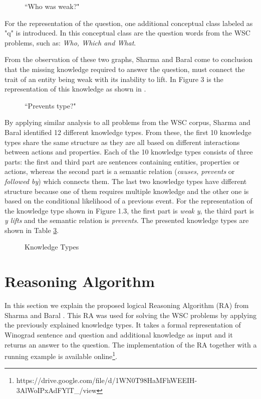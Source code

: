 \begin{figure}
	\centering
	
	\caption{\label{Graph12}``Who was weak?"}
\end{figure}

For the representation of the question, one additional conceptual class labeled as "q" is introduced. In this conceptual class are the question words from the WSC problems, such as: \textit{Who, Which and What}.

From the observation of these two graphs, Sharma and Baral \cite{2018CommonsenseKT} come to conclusion that the missing knowledge required to answer the question, must connect the trait of an entity being weak with its inability to lift. In Figure 3 is the representation of this knowledge as shown in \cite{2018CommonsenseKT}. 


\begin{figure}
	\centering
	
	\caption{\label{Graph13}``Prevents type?"}
\end{figure}


By applying similar analysis to all problems from the WSC corpus, Sharma and Baral \cite{2018CommonsenseKT} identified 12 different knowledge types. From these, the first 10 knowledge types share the same structure as they are all based on different interactions between actions and properties. Each of the 10 knowledge types consists of three parts: the first and third part are sentences containing entities, properties or actions, whereas the second part is a semantic relation (\textit{causes, prevents} or \textit{followed by}) which connects them. The last two knowledge types have different structure because one of them requires multiple knowledge and the other one is based on the conditional likelihood of a previous event. 
For the representation of the knowledge type shown in Figure 1.3, the first part is \textit{weak y}, the third part is \textit{y lifts} and the semantic relation is \textit{prevents}.
The presented knowledge types are shown in Table \ref{Ktypes}.

\begin{figure} [h!]
	\centering
	
	\caption{\label{Ktypes} Knowledge Types}
\end{figure}

\section{Reasoning Algorithm}
\label{RA}
In this section we explain the proposed logical Reasoning Algorithm (RA) from Sharma and Baral \cite{2018CommonsenseKT}. This RA was used for solving the WSC problems by applying the previously explained knowledge types. It takes a formal representation of Winograd sentence and question and additional knowledge as input and it returns an answer to the question. The implementation of the RA together with a running example is available online\footnote{https://drive.google.com/file/d/1WN0T98HaMFhWEEIH-3AlWoIPxAdFYlT\_/view}. 

